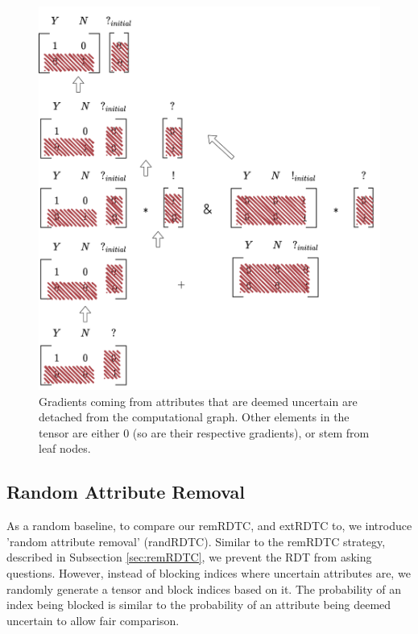 \documentclass[a4paper,cleardoubleempty,BCOR1cm, 11pt]{report}
\begin{document}
\begin{figure}[t!]
\begin{minipage}{0.45\textwidth}
		\includegraphics[width=1\textwidth]{images/extended_vocab_backward.pdf}
		\caption{Gradients coming from attributes that are deemed uncertain are detached from the computational graph. Other elements in the tensor are either $0$ (so are their respective gradients), or stem from leaf nodes.}
		\label{fig:extended_vocab_backward}
	\end{minipage}
\end{figure}


\subsection{Random Attribute Removal}
As a random baseline, to compare our remRDTC, and extRDTC to, we introduce 'random attribute removal' (randRDTC).
Similar to the remRDTC strategy, described in Subsection \ref{sec:remRDTC}, we prevent the RDT from asking questions. However, instead of blocking indices where uncertain attributes are, we randomly generate a tensor and block indices based on it. The probability of an index being blocked is similar to the probability of an attribute being deemed uncertain to allow fair comparison.
\end{document}
